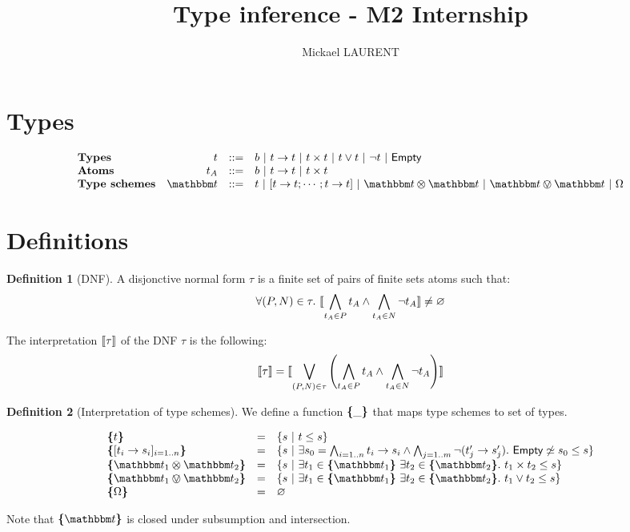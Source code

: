 \documentclass[a4paper]{article}
\title{\vspace{1.5cm}Type inference - M2 Internship}
\author{Mickael LAURENT}
\date{\vspace{-5ex}}
\theoremstyle{definition}
\newtheorem{definition}{Definition}
\begin{document}
  \maketitle
  
    \section{Types}

    \[
        \begin{array}{lrcl}
        \textbf{Types} & t & ::= & b\alt \arrow t t\alt \pair t t\alt t\vee t \alt \neg t \alt \Empty\\
        \textbf{Atoms} & t_A & ::= & b\alt \arrow t t\alt \pair t t\\
        \textbf{Type schemes} & \ts & ::= & t \alt \tsfun {\arrow t t ; \cdots ; \arrow t t} \alt \ts \tstimes \ts \alt \ts \tsor \ts \alt \tsempty
        \end{array}
    \]

    \section{Definitions}

    \begin{definition}[DNF]
      A disjonctive normal form $\tau$ is a finite set of pairs of finite sets atoms such that:
      \[ \forall (P,N)\in \tau.\ {\llbracket \bigwedge_{t_A \in P} t_A \land \bigwedge_{t_A \in N} \neg t_A \rrbracket} \neq \varnothing \]

      The interpretation ${\llbracket \tau \rrbracket}$ of the DNF $\tau$ is the following:
      \[
        {\llbracket \tau \rrbracket} = {\llbracket \bigvee_{(P,N)\in \tau} \left(\bigwedge_{t_A \in P} t_A \land \bigwedge_{t_A \in N} \neg t_A \right) \rrbracket}
      \]
    \end{definition}

    \begin{definition}[Interpretation of type schemes]
      We define a function $\textbf{\{}\_\textbf{\}}$ that maps type schemes to set of types.

      \begin{align*}
        \begin{array}{lcl}
        \tsint t &=& \{s\alt t \leq s\}\\
        \tsint {\tsfunone {t_i} {s_i}_{i=1..n}} &=& \{s\alt
        \exists s_0 = \bigwedge_{i=1..n} \arrow {t_i} {s_i}
        \land \bigwedge_{j=1..m} \neg (\arrow {t_j'} {s_j'}).\ 
        \Empty \not\simeq s_0 \leq s \}\\
        \tsint {\ts_1 \tstimes \ts_2} &=& \{s\alt \exists t_1 \in \tsint {\ts_1}\ 
        \exists t_2 \in \tsint {\ts_2}.\ \pair {t_1} {t_2} \leq s\}\\
        \tsint {\ts_1 \tsor \ts_2} &=& \{s\alt \exists t_1 \in \tsint {\ts_1}\ 
        \exists t_2 \in \tsint {\ts_2}.\ {t_1} \vee {t_2} \leq s\}\\
        \tsint \tsempty &=& \varnothing
        \end{array}
      \end{align*}

    Note that $\tsint \ts$ is closed under subsumption and intersection.
    \end{definition}
\end{document}
